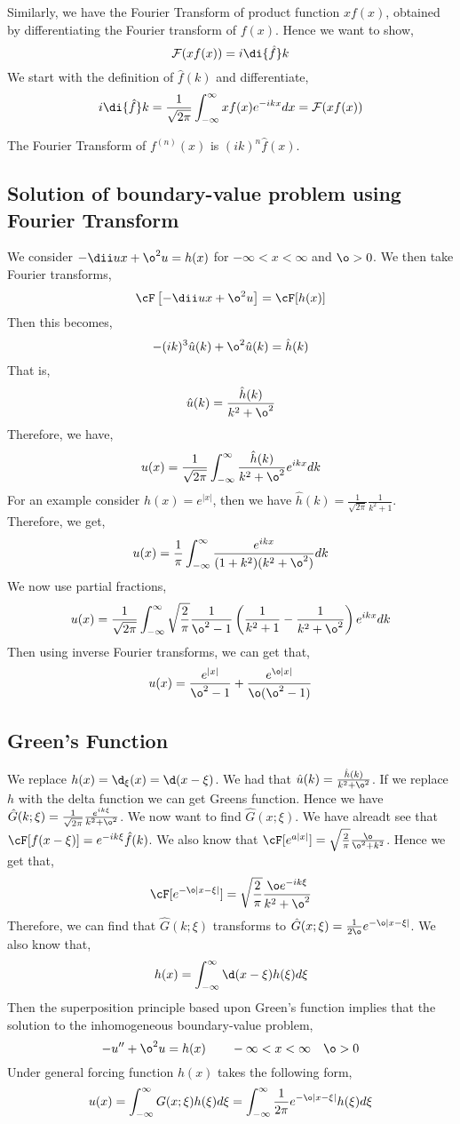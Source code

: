 Similarly, we have the Fourier Transform of product function $xf(x)$, obtained by differentiating the Fourier transform of $f(x)$. Hence we want to show,
$$ \mathcal{F}(xf(x)) = i \di {\hat f} k $$
We start with the definition of $\hat f(k)$ and differentiate,
$$ i\di {\hat f} k = \frac{1}{\sqrt{2\pi}}\int_{-\infty}^\infty xf(x)e^{-ikx}dx = \mathcal{F}(xf(x)) $$
\begin{ncor}
   The Fourier Transform of $f^{(n)}(x)$ is $(ik)^n \hat f(x)$.
\end{ncor}

\subsection{Solution of boundary-value problem using Fourier Transform}
We consider $-\dii u x + \o^2 u = h(x)$ for $-\infty < x < \infty$ and $\o > 0$. We then take Fourier transforms,
$$ \cF \left[ -\dii u x + \o^2 u \right] = \cF [h(x)] $$
Then this becomes,
$$ -(ik)^3\hat u(k) + \o^2\hat u(k) = \hat h(k) $$
That is,
$$ \hat u(k) = \frac{\hat h (k)}{k^2 + \o^2} $$
Therefore, we have,
$$ u(x) = \frac{1}{\sqrt{2\pi}}\int_{-\infty}^\infty \frac{\hat h(k)}{k^2 + \o^2}e^{ikx}dk $$
For an example consider $h(x) = e^{|x|}$, then we have $\hat h(k) = \frac{1}{\sqrt{2\pi}} \frac{1}{k^2 + 1}$. Therefore, we get,
$$ u(x) = \frac{1}{\pi}\int_{-\infty}^\infty \frac{e^{ikx}}{(1 + k^2)(k^2 + \o^2)}dk $$
We now use partial fractions,
$$  u(x) = \frac{1}{\sqrt{2\pi}}\int_{-\infty}^\infty \sqrt{\frac{2}{\pi}} \frac{1}{\o^2 - 1}\left( \frac{1}{k^2 + 1} - \frac{1}{k^2 + \o^2} \right)e^{ikx}dk $$
Then using inverse Fourier transforms, we can get that,
$$ u(x) = \frac{e^{|x|}}{\o^2 - 1} + \frac{e^{\o|x|}}{\o(\o^2 - 1)} $$

\subsection{Green's Function}
We replace $h(x) = \d_\xi(x) = \d (x - \xi)$. We had that $\hat u(k) = \frac{\hat h(k)}{k^2 + \o^2}$. If we replace $h$ with the delta function we can get Greens function. Hence we have $\hat G(k; \xi) = \frac{1}{\sqrt{2\pi}}\frac{e^{ik\xi}}{k^2 + \o^2}$. We now want to find $\hat G(x; \xi)$. We have alreadt see that $\cF[ f(x - \xi)] = e^{-ik\xi}\hat f(k)$.
We also know that $\cF [ e^{a|x|}] = \sqrt{\frac{2}{\pi}}\frac{\o}{\o^2 + k^2}$. Hence we get that,
$$ \cF[ e^{-\o|x - \xi|}] = \sqrt{\frac{2}{\pi}} \frac{\o e^{-ik\xi}}{k^2 + \o^2} $$
Therefore, we can find that $\hat G(k; \xi)$ transforms to $\hat G(x; \xi) = \frac{1}{2\o} e^{-\o|x - \xi|}$. We also know that,
$$ h(x) = \int_{-\infty}^\infty \d(x - \xi)h(\xi)d\xi $$
Then the superposition principle based upon Green's function implies that the solution to the inhomogeneous boundary-value problem,
$$ -u'' + \o^2 u = h(x) \qquad -\infty < x < \infty \quad \o > 0$$
Under general forcing function $h(x)$ takes the following form,
$$ u(x) = \int_{-\infty}^\infty G(x; \xi)h(\xi) d\xi = \int_{-\infty}^\infty \frac{1}{2\pi} e^{-\o|x - \xi|}h(\xi)d\xi$$

